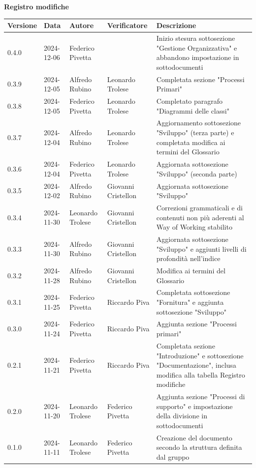 \documentclass[10pt]{article}
\begin{document}
\begin{center}
\textbf{Registro modifiche}\\
\vspace{2mm}

\begin{tabularx}{\textwidth}{|l|l|l|l|X|}
\hline
\textbf{Versione} & \textbf{Data} & \textbf{Autore} & \textbf{Verificatore} & \textbf{Descrizione}\\
    \hline
    0.4.0 & 2024-12-06 & Federico Pivetta &  & Inizio stesura sottosezione "Gestione Organizzativa" e abbandono impostazione in sottodocumenti\\
    \hline
    0.3.9 & 2024-12-05 & Alfredo Rubino & Leonardo Trolese & Completata sezione "Processi Primari"\\
    \hline
    0.3.8 & 2024-12-05 & Federico Pivetta & Leonardo Trolese & Completato paragrafo "Diagrammi delle classi"\\
    \hline
    0.3.7 & 2024-12-04 & Alfredo Rubino & Leonardo Trolese & Aggiornamento sottosezione "Sviluppo" (terza parte) e completata modifica ai termini del Glossario\\
    \hline
    0.3.6 & 2024-12-04 & Federico Pivetta & Leonardo Trolese & Aggiornata sottosezione "Sviluppo" (seconda parte)\\
    \hline
    0.3.5 & 2024-12-02 & Alfredo Rubino & Giovanni Cristellon & Aggiornata sottosezione "Sviluppo"\\
    \hline
    0.3.4 & 2024-11-30 & Leonardo Trolese & Giovanni Cristellon & Correzioni grammaticali e di contenuti non più aderenti al Way of Working stabilito\\
    \hline
    0.3.3 & 2024-11-30 & Alfredo Rubino & Giovanni Cristellon & Aggiornata sottosezione "Sviluppo" e aggiunti livelli di profondità nell'indice\\
    \hline
    0.3.2 & 2024-11-28 & Alfredo Rubino & Giovanni Cristellon & Modifica ai termini del Glossario\\
    \hline
    0.3.1 & 2024-11-25 & Federico Pivetta & Riccardo Piva & Completata sottosezione "Fornitura" e aggiunta sottosezione "Sviluppo"\\
    \hline
    0.3.0 & 2024-11-24 & Federico Pivetta & Riccardo Piva & Aggiunta sezione "Processi primari"\\
    \hline
     0.2.1 & 2024-11-21 & Federico Pivetta  & Riccardo Piva & Completata sezione "Introduzione" e sottosezione "Documentazione", inclusa modifica alla tabella Registro modifiche\\
    \hline
    0.2.0 & 2024-11-20 & Leonardo Trolese & Federico Pivetta & Aggiunta sezione "Processi di supporto" e impostazione della divisione in sottodocumenti\\
    \hline
    0.1.0 & 2024-11-11 & Leonardo Trolese & Federico Pivetta & Creazione del documento secondo la struttura definita dal gruppo\\
    \hline
\end{tabularx}
\end{center}
\end{document}
